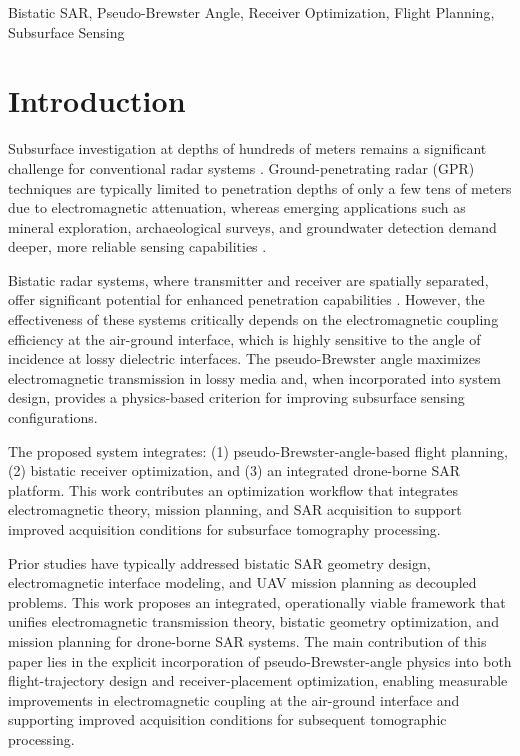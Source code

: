 \documentclass[conference]{IEEEtran}
\begin{document}
\begin{IEEEkeywords}
Bistatic SAR, Pseudo-Brewster Angle, Receiver Optimization, Flight Planning, Subsurface Sensing
\end{IEEEkeywords}

\section{Introduction}

Subsurface investigation at depths of hundreds of meters remains a significant challenge for conventional radar systems \cite{daniels_gpr}. Ground-penetrating radar (GPR) techniques are typically limited to penetration depths of only a few tens of meters due to electromagnetic attenuation, whereas emerging applications such as mineral exploration, archaeological surveys, and groundwater detection demand deeper, more reliable sensing capabilities \cite{Soil}.

Bistatic radar systems, where transmitter and receiver are spatially separated, offer significant potential for enhanced penetration capabilities \cite{cherniakov_bistatic}. However, the effectiveness of these systems critically depends on the electromagnetic coupling efficiency at the air-ground interface, which is highly sensitive to the angle of incidence at lossy dielectric interfaces.
The pseudo-Brewster angle maximizes electromagnetic transmission in lossy media \cite{mcmichael_brewster} and, when incorporated into system design, provides a physics-based criterion for improving subsurface sensing configurations.

The proposed system integrates: (1) pseudo-Brewster-angle-based flight planning, (2) bistatic receiver optimization, and (3) an integrated drone-borne SAR platform. This work contributes an optimization workflow that integrates electromagnetic theory, mission planning, and SAR acquisition to support improved acquisition conditions for subsurface tomography processing.

Prior studies have typically addressed bistatic SAR geometry design, electromagnetic interface modeling, and UAV mission planning as decoupled problems. This work proposes an integrated, operationally viable framework that unifies electromagnetic transmission theory, bistatic geometry optimization, and mission planning for drone-borne SAR systems. The main contribution of this paper lies in the explicit incorporation of pseudo-Brewster-angle physics into both flight-trajectory design and receiver-placement optimization, enabling measurable improvements in electromagnetic coupling at the air-ground interface and supporting improved acquisition conditions for subsequent tomographic processing.
\end{document}
